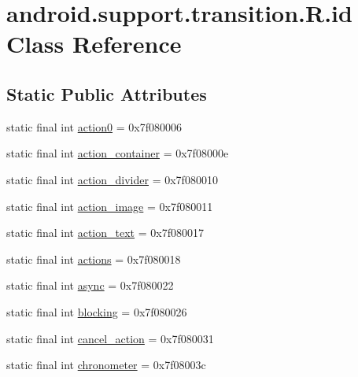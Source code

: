 \hypertarget{classandroid_1_1support_1_1transition_1_1R_1_1id}{}\section{android.\+support.\+transition.\+R.\+id Class Reference}
\label{classandroid_1_1support_1_1transition_1_1R_1_1id}
\subsection*{Static Public Attributes}
\begin{DoxyCompactItemize}
\item 
static final int \mbox{\hyperlink{classandroid_1_1support_1_1transition_1_1R_1_1id_a4f17fa375c0c564d0cf69ba0cbb87eb9}{action0}} = 0x7f080006
\item 
static final int \mbox{\hyperlink{classandroid_1_1support_1_1transition_1_1R_1_1id_a5dee43fd7c62be47631539c1e8a4a24b}{action\+\_\+container}} = 0x7f08000e
\item 
static final int \mbox{\hyperlink{classandroid_1_1support_1_1transition_1_1R_1_1id_afb68a5afbb8074cdc5c28afd9a807b62}{action\+\_\+divider}} = 0x7f080010
\item 
static final int \mbox{\hyperlink{classandroid_1_1support_1_1transition_1_1R_1_1id_a5918eee8de93159a0a8b71c60b620c49}{action\+\_\+image}} = 0x7f080011
\item 
static final int \mbox{\hyperlink{classandroid_1_1support_1_1transition_1_1R_1_1id_aa2be10087bc2139fb9c96446b83d821a}{action\+\_\+text}} = 0x7f080017
\item 
static final int \mbox{\hyperlink{classandroid_1_1support_1_1transition_1_1R_1_1id_a551e16c7148efd1e8127d55b1629ace4}{actions}} = 0x7f080018
\item 
static final int \mbox{\hyperlink{classandroid_1_1support_1_1transition_1_1R_1_1id_a8842bedcbb3950afaa62105e4940ef19}{async}} = 0x7f080022
\item 
static final int \mbox{\hyperlink{classandroid_1_1support_1_1transition_1_1R_1_1id_a56e206db702c5ae19ab7c4b70e533b6b}{blocking}} = 0x7f080026
\item 
static final int \mbox{\hyperlink{classandroid_1_1support_1_1transition_1_1R_1_1id_a70f2c4ab5197e5c74e4d59469561499b}{cancel\+\_\+action}} = 0x7f080031
\item 
static final int \mbox{\hyperlink{classandroid_1_1support_1_1transition_1_1R_1_1id_a3e7496bac42210b89cd538b2f156066d}{chronometer}} = 0x7f08003c

\end{DoxyCompactItemize}
